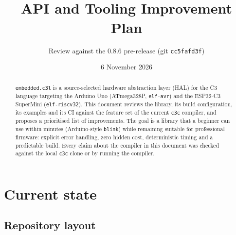 \documentclass[11pt,a4paper]{article}
\title{\pkg{embedded.c3l}\\[4pt]\large API and Tooling Improvement Plan}
\author{Review against the \pkg{c3c} 0.8.6 pre-release (git \texttt{cc5fafd3f})}
\date{6 November 2026}
\newcommand{\pkg}[1]{\texttt{#1}}
\begin{document}
\maketitle

\begin{abstract}
\noindent
\pkg{embedded.c3l} is a source-selected hardware abstraction layer (HAL) for the C3 language
targeting the Arduino Uno (ATmega328P, \pkg{elf-avr}) and the ESP32-C3 SuperMini
(\pkg{elf-riscv32}). This document reviews the library, its build configuration, its
examples and its CI against the feature set of the current \pkg{c3c} compiler, and proposes a
prioritised list of improvements. The goal is a library that a beginner can use within
minutes (Arduino-style \pkg{blink}) while remaining suitable for professional firmware:
explicit error handling, zero hidden cost, deterministic timing and a predictable build.
Every claim about the compiler in this document was checked against the local \pkg{c3c}
clone or by running the compiler.
\end{abstract}

\tableofcontents
\newpage

\section{Current state}

\subsection{Repository layout}
\end{document}
